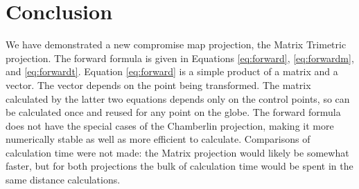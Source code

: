 \documentclass[]{interact}
\begin{document}
%
%
%
%

\section{Conclusion}
We have demonstrated a new compromise map projection, the Matrix Trimetric
projection. The forward formula is given in Equations \ref{eq:forward},
\ref{eq:forwardm}, and \ref{eq:forwardt}. Equation \ref{eq:forward} is a simple
product of a matrix and a vector. The vector depends on the point being
transformed. The matrix calculated by the latter two equations depends only on
the control points, so can be calculated once and reused for any point on the
globe. The forward formula does not have the special cases of the Chamberlin
projection, making it more numerically stable as well as more efficient to
calculate. Comparisons of calculation time were not made:
the Matrix projection would likely be somewhat faster, but for both projections
the bulk of calculation time would be spent in the same distance calculations.
\end{document}
